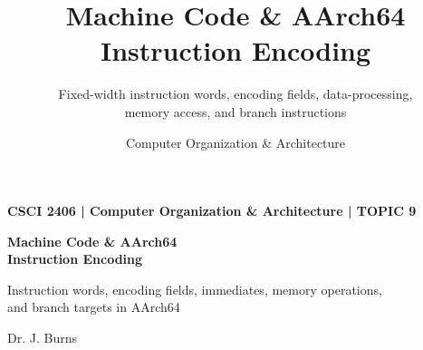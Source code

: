 \documentclass[aspectratio=169,11pt,t]{beamer}
\title[Topic 9]{
  Machine Code \& AArch64 Instruction Encoding
}
\subtitle{
  Fixed-width instruction words, encoding fields, data-processing,\\
  memory access, and branch instructions
}
\author{
  Computer Organization \& Architecture
}
\date{}
\begin{document}

\begin{frame}[plain]

\vspace*{\fill}

\begin{minipage}{0.88\textwidth}
{\color{gold}\normalsize\bfseries
CSCI 2406 \;|\; Computer Organization \& Architecture \;|\; TOPIC 9
\par}

\vspace{0.25cm}

{\color{white}\fontsize{24}{28}\selectfont\bfseries
Machine Code \& AArch64\\[0.08cm]Instruction Encoding
\par}

\vspace{0.35cm}

{\color{white!80}\large
Instruction words, encoding fields, immediates, memory operations,\\and branch targets in AArch64
\par}
\end{minipage}

\vfill

{\color{white!70}\small
Dr. J. Burns
\par}

\vspace*{\fill}
\end{frame}

\end{document}
